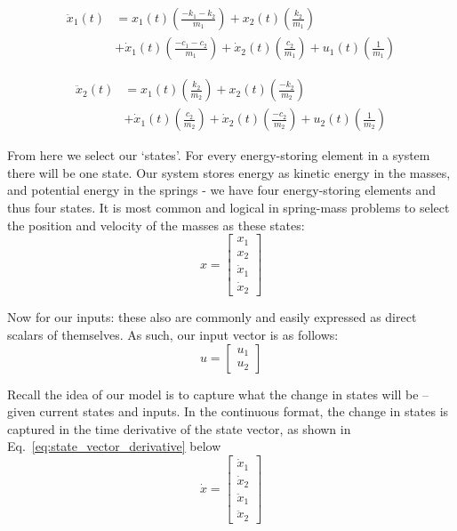 \begin{equation}
    \begin{split}
        \ddot{x}_1(t) &= x_1(t)\left(\frac{-k_1-k_2}{m_1}\right) + x_2(t)\left(\frac{k_2}{m_1}\right) \\ 
        &+ \dot{x}_1(t)\left(\frac{-c_1-c_2}{m_1}\right)+\dot{x}_2(t)\left(\frac{c_2}{m_1}\right)+u_1(t)\left(\frac{1}{m_1}\right)
    \end{split}
    \label{eq:x1_eom}
\end{equation}

\begin{equation} 
    \begin{split}
        \ddot{x}_2(t) &= x_1(t)\left(\frac{k_2}{m_2}\right) + x_2(t)\left(\frac{-k_2}{m_2}\right) \\
        &+ \dot{x}_1(t)\left(\frac{c_2}{m_2}\right)+\dot{x}_2(t)\left(\frac{-c_2}{m_2}\right)+u_2(t)\left(\frac{1}{m_2}\right)
    \end{split}
    \label{eq:x2_eom}
\end{equation}

From here we select our `states'. For every energy-storing element in a system there will be one state. Our system stores energy as kinetic energy in the masses, and potential energy in the springs - we have four energy-storing elements and thus four states. It is most common and logical in spring-mass problems to select the position and velocity of the masses as these states:
\begin{equation} 
    x =
    \begin{bmatrix}
        x_1 \\ x_2 \\ \dot x_1 \\ \dot x_2
    \end{bmatrix}
    \label{eq:state_vector}
\end{equation}

Now for our inputs: these also are commonly and easily expressed as direct scalars of themselves. As such, our input vector is as follows:
\begin{equation} 
    u =
    \begin{bmatrix}
        u_1 \\ u_2
    \end{bmatrix}
    \label{eq:input_vector}
\end{equation}

Recall the idea of our model is to capture what the change in states will be -- given current states and inputs. In the continuous format, the change in states is captured in the time derivative of the state vector, as shown in Eq.~\ref{eq:state_vector_derivative} below
\begin{equation} 
    \dot x =
    \begin{bmatrix}
        \dot x_1 \\ \dot x_2 \\ \ddot x_1 \\ \ddot x_2
    \end{bmatrix}
    \label{eq:state_vector_derivative}
\end{equation}

